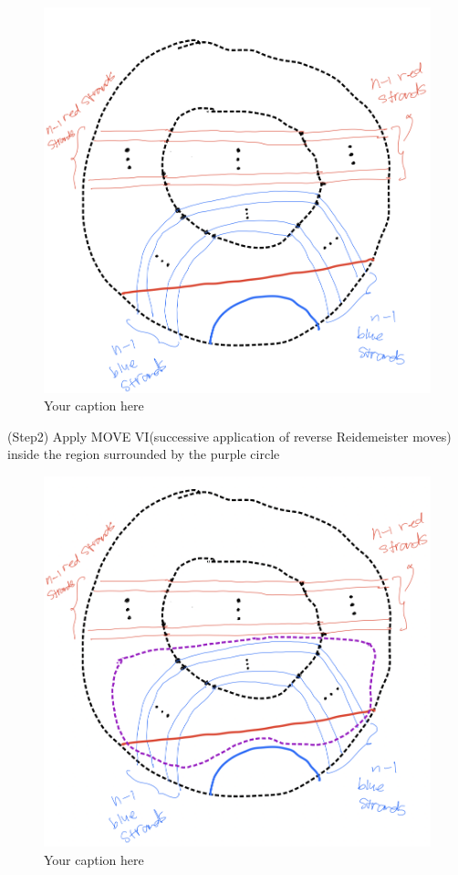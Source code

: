 \begin{figure}[H] %
    \centering
    \includegraphics[width=\linewidth]{diagrams/definition14-2/3.png} %
    \caption{Your caption here}
    \label{fig:your-label}
\end{figure}

(Step2) Apply MOVE \RN{6}(successive application of reverse Reidemeister moves) inside the region surrounded by the purple circle

\begin{figure}[H] %
    \centering
    \includegraphics[width=\linewidth]{diagrams/definition14-2/4.png} %
    \caption{Your caption here}
    \label{fig:your-label}
\end{figure}

